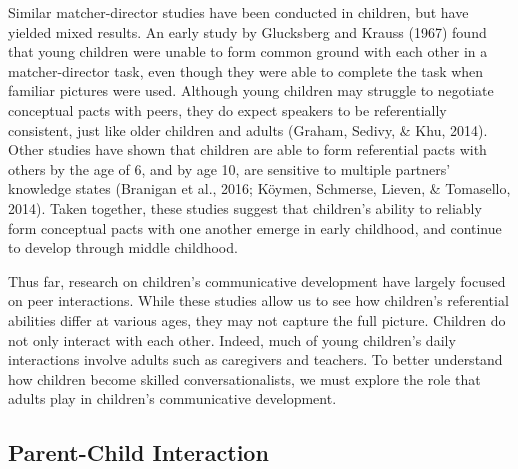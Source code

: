 \documentclass[10pt, letterpaper]{article}
\begin{document}
Similar matcher-director studies have been conducted in children, but
have yielded mixed results. An early study by Glucksberg and Krauss
(1967) found that young children were unable to form common ground with
each other in a matcher-director task, even though they were able to
complete the task when familiar pictures were used. Although young
children may struggle to negotiate conceptual pacts with peers, they do
expect speakers to be referentially consistent, just like older children
and adults (Graham, Sedivy, \& Khu, 2014). Other studies have shown that
children are able to form referential pacts with others by the age of 6,
and by age 10, are sensitive to multiple partners' knowledge states
(Branigan et al., 2016; Köymen, Schmerse, Lieven, \& Tomasello, 2014).
Taken together, these studies suggest that children's ability to
reliably form conceptual pacts with one another emerge in early
childhood, and continue to develop through middle childhood.

Thus far, research on children's communicative development have largely
focused on peer interactions. While these studies allow us to see how
children's referential abilities differ at various ages, they may not
capture the full picture. Children do not only interact with each other.
Indeed, much of young children's daily interactions involve adults such
as caregivers and teachers. To better understand how children become
skilled conversationalists, we must explore the role that adults play in
children's communicative development.

\hypertarget{parent-child-interaction}{%
\subsection{Parent-Child Interaction}\label{parent-child-interaction}}
\end{document}
